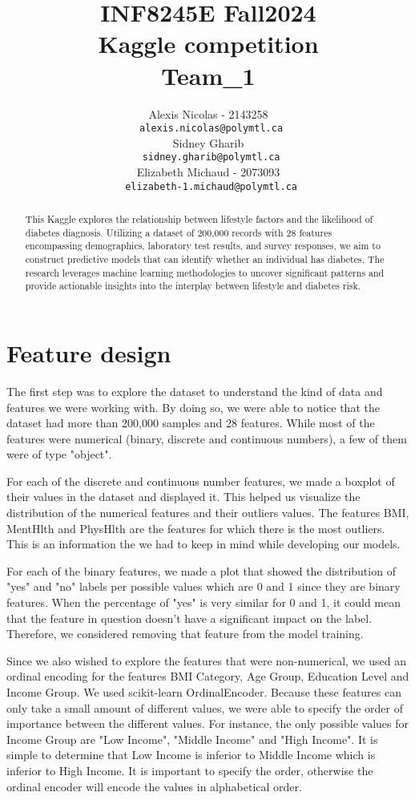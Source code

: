 \documentclass{article} %
\title{INF8245E Fall2024  \\ Kaggle competition \\ Team\_1 }
\author{Alexis Nicolas - 2143258 \\
\texttt{\ alexis.nicolas@polymtl.ca} \\
\And
Sidney Gharib \\
\texttt{\ sidney.gharib@polymtl.ca} \\
\And
Elizabeth Michaud - 2073093 \\
\texttt{\ elizabeth-1.michaud@polymtl.ca} \\
}
\begin{document}
\maketitle

\begin{abstract}
This Kaggle explores the relationship between lifestyle factors and the likelihood of diabetes diagnosis.
Utilizing a dataset of 200,000 records with 28 features encompassing demographics,
laboratory test results, and survey responses, we aim to construct predictive models that can identify whether an individual has diabetes.
The research leverages machine learning methodologies to uncover significant patterns and provide actionable insights into the interplay between lifestyle and diabetes risk.
\end{abstract}

\section{Feature design}

The first step was to explore the dataset to understand the kind of data and features we were working with. By doing so, we were 
able to notice that the dataset had more than 200,000 samples and 28 features. While most of the features were numerical 
(binary, discrete and continuous numbers), a few of them were of type "object". 

For each of the discrete and continuous number features, we made a boxplot of their values in the dataset and displayed it. 
This helped us visualize the distribution of the numerical features and their outliers values. The features BMI, MentHlth and PhysHlth
are the features for which there is the most outliers. This is an information the we had to keep in mind while developing our models.

For each of the binary features, we made a plot that showed the distribution of "yes" and "no" labels per possible values which are 0 and 1 since they are binary features. 
When the percentage of "yes" is very similar for 0 and 1, it could mean that the feature in question doesn't have a significant 
impact on the label. Therefore, we considered removing that feature from the model training. 

Since we also wished to explore the features that were non-numerical, we used an ordinal encoding for the features BMI Category, 
Age Group, Education Level and Income Group. We used scikit-learn OrdinalEncoder. Because these features can only take a small amount of different values, we were able to 
specify the order of importance between the different values. For instance, the only possible values for Income Group are "Low Income", 
"Middle Income" and "High Income". It is simple to determine that Low Income is inferior to Middle Income which is inferior to High 
Income. It is important to specify the order, otherwise the ordinal encoder will encode the values in alphabetical order.
\end{document}
